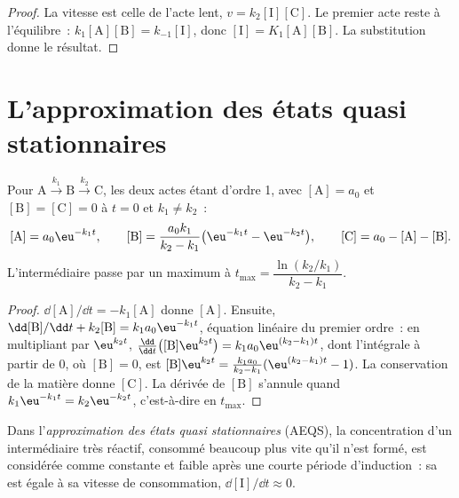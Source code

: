 \begin{proof}
La vitesse est celle de l'acte lent, $v = k_2[\mathrm{I}][\mathrm{C}]$.
Le premier acte reste à l'équilibre~: $k_1[\mathrm{A}][\mathrm{B}] =
k_{-1}[\mathrm{I}]$, donc $[\mathrm{I}] = K_1[\mathrm{A}][\mathrm{B}]$.
La substitution donne le résultat.
\end{proof}

\section{L'approximation des états quasi stationnaires}

\begin{theorem}\label{thm:b1:elementary-steps:consecutive}
Pour $\mathrm{A} \xrightarrow{k_1} \mathrm{B} \xrightarrow{k_2} \mathrm{C}$,
les deux actes étant d'ordre 1, avec $[\mathrm{A}] = a_0$ et $[\mathrm{B}] =
[\mathrm{C}] = 0$ à $t = 0$ et $k_1 \ne k_2$~:
\[
  [\mathrm{A}] = a_0\eu^{-k_1t}, \qquad
  [\mathrm{B}] = \frac{a_0k_1}{k_2 - k_1}\big(\eu^{-k_1t} - \eu^{-k_2t}\big),
  \qquad [\mathrm{C}] = a_0 - [\mathrm{A}] - [\mathrm{B}] .
\]
L'intermédiaire passe par un maximum à $t_{\max} = \dfrac{\ln(k_2/k_1)}
{k_2 - k_1}$.
\end{theorem}

\begin{proof}
$\dd[\mathrm{A}]/\dd t = -k_1[\mathrm{A}]$ donne $[\mathrm{A}]$. Ensuite,
$\dd[\mathrm{B}]/\dd t + k_2[\mathrm{B}] = k_1a_0\eu^{-k_1t}$, équation
linéaire du premier ordre~: en multipliant par $\eu^{k_2t}$, $\frac{\dd}{\dd t}
\big([\mathrm{B}]\eu^{k_2t}\big) = k_1a_0\eu^{(k_2-k_1)t}$, dont
l'intégrale à partir de 0, où $[\mathrm{B}] = 0$, est $[\mathrm{B}]\eu^{k_2t} =
\frac{k_1a_0}{k_2-k_1}(\eu^{(k_2-k_1)t} - 1)$. La conservation de la
matière donne
$[\mathrm{C}]$. La dérivée de $[\mathrm{B}]$ s'annule quand $k_1\eu^{-k_1t}
= k_2\eu^{-k_2t}$, c'est-à-dire en $t_{\max}$.
\end{proof}

\begin{definition}\label{def:b1:elementary-steps:qssa}
Dans l'\emph{approximation des états quasi stationnaires}
(AEQS), la concentration d'un intermédiaire très réactif, consommé
beaucoup plus vite qu'il n'est formé, est considérée comme constante et
faible après une courte période d'induction~: sa 
est égale à sa vitesse de consommation,
$\dd[\mathrm{I}]/\dd t \approx 0$.
\end{definition}

